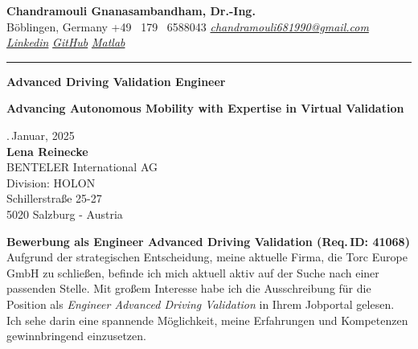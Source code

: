 \documentclass[a4paper,10pt]{article}
\newcommand{\link}[1]{{\textit{#1}}}
\begin{document}
\thispagestyle{plain}

\begin{center}
    {\Large \textbf{Chandramouli Gnanasambandham, Dr.-Ing.}}\\ 
    
    \vspace{0.2cm}
    \small B\"oblingen, Germany \hfill  \bullet  \hfill  +49 \ 179 \ 6588043 \hfill \bullet  \hfill
    \textup{\href{mailto:chandramouli681990@gmail.com}{\link{chandramouli681990@gmail.com}}} \hfill \bullet \hfill
    \textup{\href{https://linkedin.com/in/ganasambandhamc}{\link{Linkedin}}} \hfill \bullet \hfill
    \textup{\href{https://github.com/chandramouli6890}{\link{GitHub}}} \hfill \bullet \hfill
    \textup{\href{https://de.mathworks.com/matlabcentral/profile/authors/4267772}{\link{Matlab}}}

    \vspace{-0.2cm}
    {\rule{\linewidth}{0.8pt}}

    \vspace{0.2cm}
    {\Large \textbf{Advanced Driving Validation Engineer}}
    
    \vspace{0.1cm}
    \colorbox{gray!40}{%
        \parbox{0.99\textwidth}{%
            \centering \textcolor{highlightcolor}{\textbf{Advancing Autonomous Mobility with Expertise in Virtual Validation}}
        }%
    }
\end{center}

\vspace{0.5cm}
.\,Januar, 2025\\

{\noindent
\textbf{Lena Reinecke}\\
BENTELER International AG\\
Division: HOLON\\
Schillerstraße 25-27\\
5020 Salzburg - Austria\\ 
}

\noindent \textbf{Bewerbung als Engineer Advanced Driving Validation (Req.\,ID: 41068)} \\

\noindent Aufgrund der strategischen Entscheidung, meine aktuelle Firma, die
Torc Europe GmbH zu schließen, befinde ich mich aktuell aktiv auf der Suche
nach einer passenden Stelle. Mit großem Interesse habe ich die Ausschreibung
für die Position als \textit{Engineer Advanced Driving Validation} in Ihrem Jobportal
gelesen. Ich sehe darin eine spannende Möglichkeit, meine Erfahrungen und
Kompetenzen gewinnbringend einzusetzen. \\
\end{document}
